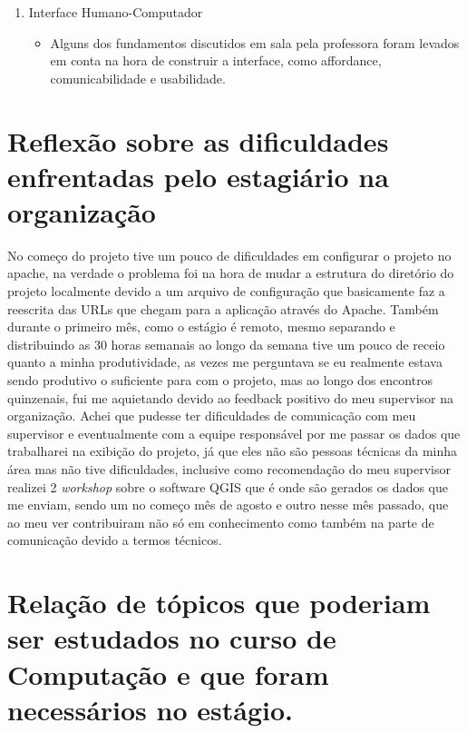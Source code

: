 \documentclass{ufscar}
\begin{document}
\begin{enumerate}
  \item Interface Humano-Computador
  \begin{itemize}
    \item Alguns dos fundamentos discutidos em sala pela professora foram levados em conta na hora de construir a interface, como affordance, comunicabilidade e usabilidade.
  \end{itemize}

\end{enumerate}

\section{Reflexão sobre as dificuldades enfrentadas pelo estagiário na organização}
No começo do projeto tive um pouco de dificuldades em configurar o projeto no apache, na verdade o problema foi na hora de mudar a estrutura do diretório do projeto localmente devido a um arquivo de configuração que basicamente faz a reescrita das URLs que chegam para a aplicação através do Apache. Também durante o primeiro mês, como o estágio é remoto, mesmo separando e distribuindo as 30 horas semanais ao longo da semana tive um pouco de receio quanto a minha produtividade, as vezes me perguntava se eu realmente estava sendo produtivo o suficiente para com o projeto, mas ao longo dos encontros quinzenais, fui me aquietando devido ao feedback positivo do meu supervisor na organização.
Achei que pudesse ter dificuldades de comunicação com meu supervisor e eventualmente com a equipe responsável por me passar os dados que trabalharei na exibição do projeto, já que eles não são pessoas técnicas da minha área mas não tive dificuldades, inclusive como recomendação do meu supervisor realizei 2 \textit{workshop} sobre o software QGIS que é onde são gerados os dados que me enviam, sendo um no começo mês de agosto e outro nesse mês passado, que ao meu ver contribuiram não só em conhecimento como também na parte de comunicação devido a termos técnicos.

\section{Relação de tópicos que poderiam ser estudados no curso de Computação e que foram necessários no estágio.}
\end{document}
